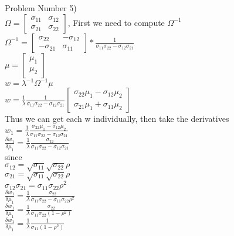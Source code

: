 \documentclass[11pt]{article}
\begin{document}
Problem Number 5)\\
$\Omega = [\begin{smallmatrix} \sigma_{11} & \sigma_{12}\\ \sigma_{21} & \sigma_{22} \end{smallmatrix}]$, First we need to compute $\Omega^{-1}$\\
$\Omega^{-1} = [\begin{smallmatrix} \sigma_{22} & -\sigma_{12}\\ -\sigma_{21} & \sigma_{11} \end{smallmatrix}]* \frac{1}{\sigma_{11}\sigma_{22} - \sigma_{12}\sigma_{21}}$\\
$\mu = [\begin{smallmatrix} \mu_{1}\\ \mu_{2} \end{smallmatrix}]$\\

$w = \lambda^{-1} \Omega^{-1} \mu$\\
$w = \frac{1}{\lambda} \frac{1}{\sigma_{11}\sigma_{22} - \sigma_{12}\sigma_{21}} [\begin{smallmatrix} \sigma_{22} \mu_{1} - \sigma_{12} \mu_{2} \\ \sigma_{21} \mu_{1} + \sigma_{11} \mu_{2} \end{smallmatrix}]$\\
Thus we can get each w individually, then take the derivatives\\
$w_{1} = \frac{1}{\lambda} \frac{\sigma_{22} \mu_{1} - \sigma_{12} \mu_{2}}{\sigma_{11}\sigma_{22} - \sigma_{12}\sigma_{21}}$\\
$\frac{\delta w_{1}}{\delta \mu_{1}} = \frac{1}{\lambda} \frac{\sigma_{22}}{\sigma_{11}\sigma_{22} - \sigma_{12}\sigma_{21}}$\\

since\\
$\sigma_{12} = \sqrt{\sigma_{11}} \sqrt{\sigma_{22}} \rho$\\
$\sigma_{21} = \sqrt{\sigma_{11}} \sqrt{\sigma_{22}} \rho$\\
$\sigma_{12} \sigma_{21} = \sigma_{11} \sigma_{22} \rho^{2}$\\

$\frac{\delta w_{1}}{\delta \mu_{1}} = \frac{1}{\lambda} \frac{\sigma_{22}}{\sigma_{11}\sigma_{22} - \sigma_{11}\sigma_{22} \rho^{2}}$\\
$\frac{\delta w_{1}}{\delta \mu_{1}} = \frac{1}{\lambda} \frac{\sigma_{22}}{\sigma_{11}\sigma_{22} (1 - \rho^{2})}$\\
$\frac{\delta w_{1}}{\delta \mu_{1}} = \frac{1}{\lambda} \frac{1}{\sigma_{11} (1 - \rho^{2})}$\\
\end{document}
